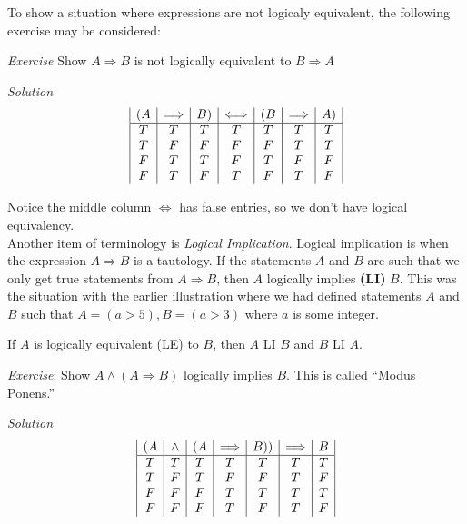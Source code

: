 To show a situation where expressions are not logicaly equivalent, the following exercise may be considered:

\textit{Exercise} 
Show $A \Longrightarrow B$ is not logically equivalent to $B \Longrightarrow A$

\textit{Solution}\\

\begin{displaymath}
\begin{array}{| c | c | c | c | c | c | c |}
(A & \Longrightarrow & B) & \Longleftrightarrow & (B & \Longrightarrow & A) \\
\hline
T & T & T & T & T & T & T \\
T & F & F & F & F & T & T \\
F & T & T & F & T & F & F \\
F & T & F & T & F & T & F \\
\end{array}
\end{displaymath}

Notice the middle column $\Longleftrightarrow$ has false entries, so we don't have logical equivalency.\\

Another item of terminology is \textit{Logical Implication}.  Logical implication is when the expression $A \Longrightarrow B$ is a tautology.  If the statements $A$ and $B$ are such that we only get true statements from $A \Longrightarrow B$, then $A$ logically implies \textbf{(LI)} $B$.  This was the situation with the earlier illustration where we had defined statements $A$ and $B$ such that $A=(a > 5), B=(a > 3)$ where $a$ is some integer.

If $A$ is logically equivalent (LE) to $B$, then $A$ LI $B$ and $B$ LI $A$.

\textit{Exercise}:  Show $A\land \left(A \Longrightarrow B\right)$ logically implies $B$.  This is called ``Modus Ponens.''  

\textit{Solution}\\

\begin{displaymath}
\begin{array}{| c | c | c | c | c | c | c |}
 (A & \land & (A & \Longrightarrow & B)) & \Longrightarrow & B \\
\hline
T & T & T & T & T & T & T \\
T & F & T & F & F & T & F \\
F & F & F & T & T & T & T \\
F & F & F & T & F & T & F \\
\end{array}
\end{displaymath}


